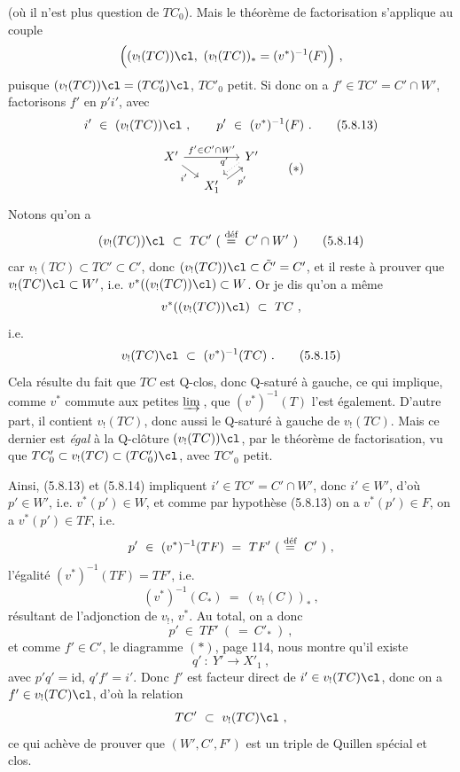 (où il n'est plus question de $TC_0$). Mais le théorème de factorisation s'applique au couple
\[
\Big( (v_!(TC))\cl,\ (v_!(TC))_* = (v^*)^{-1}(F) \Big)\ ,
\]
puisque $(v_!(TC))\cl = (TC'_0)\cl$, $TC'_0$ petit. Si donc on a $f' \in TC' = C' \cap W'$, factorisons $f'$ en $p'i'$, avec
\[
i' \ \in \ (v_!(TC))\cl\ , \qquad p' \ \in \ (v^*)^{-1}(F)\ .
\tag*{(5.8.13)}
\]
\[
\begin{tikzcd}[column sep=small, row sep=small]
X' \arrow[rr, "f' \in C' \cap W'"] \arrow[dr, "i'"'] & & Y' \arrow[dl, dotted, shift right, "q'"'] \\
& X'_1 \arrow[ur, shift right, "p'"'] &
\end{tikzcd}
\tag*{$(*)$}
\]
Notons qu'on a
\[
(v_!(TC))\cl \ \subset \ TC' \ (\ \defeq \ C' \cap W'\ )
\tag*{(5.8.14)}
\]
car $v_!(TC) \subset TC' \subset C'$, donc $(v_!(TC))\cl \subset \tilde{C}' = C'$, et il reste à prouver que $v_!(TC)\cl \subset W'$, i.e. $v^*((v_!(TC))\cl) \subset W$. Or je dis qu'on a même
\[
v^*((v_!(TC))\cl) \ \subset \ TC\ ,
\]
i.e.
\[
v_!(TC)\cl \ \subset \ (v^*)^{-1}(TC)\ .
\tag*{(5.8.15)}
\]
Cela résulte du fait que $TC$ est Q-clos, donc Q-saturé à gauche, ce qui implique, comme $v^*$ commute aux petites $\varinjlim$\,, que $(v^*)^{-1}(T)$ l'est également. D'autre part, il contient $v_!(TC)$, donc aussi le Q-saturé à gauche de $v_!(TC)$. Mais ce dernier est \textit{égal} à la Q-clôture $(v_!(TC))\cl$, par le théorème de factorisation, vu que $TC'_0 \subset v_!(TC) \subset (TC'_0)\cl$, avec $TC'_0$ petit. %

Ainsi, (5.8.13) et (5.8.14) impliquent $i' \in TC' = C' \cap W'$, donc $i' \in W'$, d'où $p' \in W'$, i.e. $v^*(p') \in W$, et comme par hypothèse
(5.8.13) on a $v^*(p') \in F$, on a $v^*(p') \in TF$, i.e.
\[
p' \ \in \ (v^*)^{-1}(TF) \ = \ TF' \ (\ \defeq \ C'\ )\ , %
\]
l'égalité $(v^*)^{-1}(TF) = TF'$, i.e.
\[
(v^*)^{-1}(C_*) \ = \ (v_!(C))_*\ ,
\]
résultant de l'adjonction de $v_!$, $v^*$. Au total, on a donc
\[
p' \ \in \ TF' \ (\ = \ C'_*\ )\ ,
\tag*{(5.8.16)}
\]
et comme $f' \in C'$, le diagramme $(*)$, page 114, nous montre qu'il existe
\[
q' \ : \ Y' \longrightarrow X'_1\ ,
\]
avec $p'q' = \mathrm{id}$, $q'f' = i'$. Donc $f'$ est facteur direct de $i' \in v_!(TC)\cl$, donc on a $f' \in v_!(TC)\cl$, d'où la relation
\[
TC' \ \subset \ v_!(TC)\cl\ ,
\]
ce qui achève de prouver que $(W', C', F')$ est un triple de Quillen spécial et clos.


